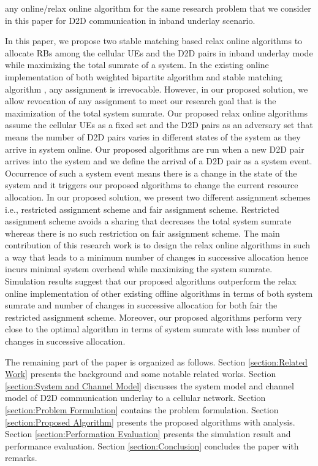 \documentclass[times]{dacauth}
\begin{document}
any online/relax online algorithm for the same research problem that we consider in this paper for D2D communication in inband underlay scenario.

\smallskip 
\noindent
In this paper, we propose two stable matching \cite{knuth1976mariages} based relax online algorithms to allocate RBs among the cellular UEs and the D2D pairs in inband underlay mode while maximizing the total sumrate of a system. In the existing online implementation of both weighted bipartite algorithm \cite{hungarian} and stable matching algorithm \cite{karp1990optimal}, any assignment is irrevocable. However, in our proposed solution, we allow revocation of any assignment to meet our research goal that is the maximization of the total system sumrate. Our proposed relax online algorithms assume the cellular UEs as a fixed set and the D2D pairs as an adversary set that means the number of D2D pairs varies in different states of the system as they arrive in system online. Our proposed algorithms are run when a new D2D pair arrives into the system and we define the arrival of a D2D pair as a system event. Occurrence of such a system event means there is a change in the state of the system and it triggers our proposed algorithms to change the current resource allocation. In our proposed solution, we present two different assignment schemes i.e., restricted assignment scheme and fair assignment scheme. Restricted assignment scheme avoids a sharing that decreases the total system sumrate whereas there is no such restriction on fair assignment scheme. The main contribution of this research work is to design the relax online algorithms in such a way that leads to a minimum number of changes in successive allocation hence incurs minimal system overhead while maximizing the system sumrate. Simulation results suggest that our proposed algorithms outperform the relax online implementation of other existing offline algorithms in terms of both system sumrate and number of changes in successive allocation for both fair the restricted assignment scheme. Moreover, our proposed algorithms perform very close to the optimal algorithm \cite{hungarian} in terms of system sumrate with less number of changes in successive allocation.  

\smallskip 
\noindent
The remaining part of the paper is organized as follows. Section \ref{section:Related Work} presents the background and some notable related works. Section \ref{section:System and Channel Model} discusses the system model and channel model of D2D communication underlay to a cellular network. Section \ref{section:Problem Formulation} contains the problem formulation. Section \ref{section:Proposed Algorithm} presents the proposed algorithms with analysis. Section \ref{section:Performation Evaluation} presents the simulation result and performance evaluation. Section \ref{section:Conclusion} concludes the paper with remarks.
\end{document}
